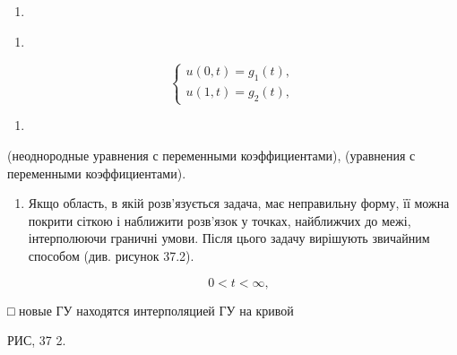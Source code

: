 \documentclass[
  ukrainian,
]{article}
\providecommand{\tightlist}{%
  \setlength{\itemsep}{0pt}\setlength{\parskip}{0pt}}
\begin{document}
\begin{enumerate}
\def\labelenumi{\alph{enumi})}
\tightlist
\item
\end{enumerate}

\begin{enumerate}
\def\labelenumi{\arabic{enumi})}
\setcounter{enumi}{5}
\tightlist
\item
\end{enumerate}

\[
\begin{cases} u(0, t) = g_1(t), \\ u(1, t) = g_2(t), \end{cases}
\]

\begin{enumerate}
\def\labelenumi{\Alph{enumi})}
\setcounter{enumi}{1}
\tightlist
\item
\end{enumerate}

(неоднородные уравнения с переменными коэффициентами), (уравнения с
переменными коэффициентами).

\begin{enumerate}
\def\labelenumi{\arabic{enumi}.}
\setcounter{enumi}{5}
\tightlist
\item
  Якщо область, в якій розв'язується задача, має неправильну форму, її
  можна покрити сіткою і наближити розв'язок у точках, найближчих до
  межі, інтерполюючи граничні умови. Після цього задачу вирішують
  звичайним способом (див. рисунок 37.2).
\end{enumerate}

\[
\quad 0 < t < \infty,
\]

□ новые ГУ находятся интерполяцией ГУ на кривой

РИС, 37 2.
\end{document}
